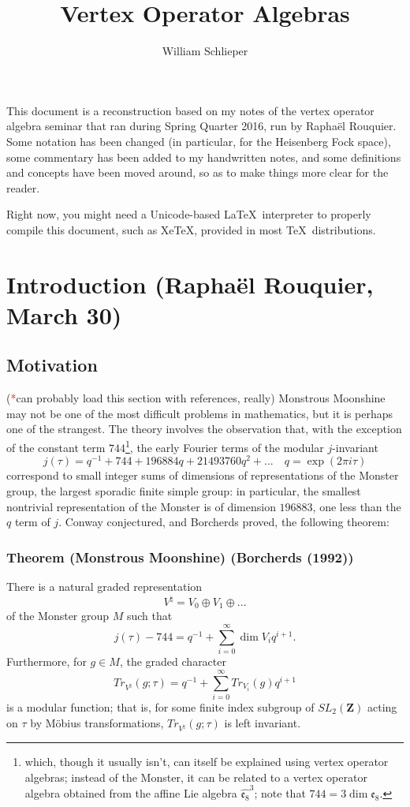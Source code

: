 \documentclass{article}
\author{William Schlieper}
\title{Vertex Operator Algebras}
\newcommand{\ZZ}{\mathbold{Z}}
\newcommand{\tk}{\textcolor{red}{*}}
\begin{document}
\maketitle
This document is a reconstruction based on my notes of the vertex operator algebra seminar that ran during Spring Quarter 2016, run by Raphaël Rouquier.  Some notation has been changed (in particular, for the Heisenberg Fock space), some commentary has been added to my handwritten notes, and some definitions and concepts have been moved around, so as to make things more clear for the reader.

Right now, you might need a Unicode-based \LaTeX\ interpreter to properly compile this document, such as XeTeX, provided in most \TeX\ distributions.
\tableofcontents

\section{Introduction (Raphaël Rouquier, March 30)}
\label{sec:intro}

\subsection{Motivation}
\label{sec:mot}
(\tk can probably load this section with references, really)
Monstrous Moonshine may not be one of the most difficult problems in mathematics, but it is perhaps one of the strangest.  The theory involves the observation that, with the exception of the constant term $744$\footnote{which, though it usually isn't, can itself be explained using vertex operator algebras; instead of the Monster, it can be related to a vertex operator algebra obtained from the affine Lie algebra $\widehat{\mathfrak{e}_8}^3$; note that $744=3 \dim \mathfrak{e}_8$.}, the early Fourier terms of the modular $j$-invariant
\[j(\tau)=q^{-1}+744+196884q+21493760q^2+... \quad q=\exp(2 \pi i \tau)\]
correspond to small integer sums of dimensions of representations of the Monster group, the largest sporadic finite simple group: in particular, the smallest nontrivial representation of the Monster is of dimension $196883$, one less than the $q$ term of $j$.  Conway conjectured, and Borcherds proved, the following theorem:
\subsubsection{Theorem (Monstrous Moonshine) (Borcherds (1992))}
\label{sec:monmoon}
There is a natural graded representation
\[V^\natural = V_0 \oplus V_1 \oplus ... \]
of the Monster group $M$ such that
\[j(\tau)-744=q^{-1}+\sum_{i=0}^{\infty} \dim V_i q^{i+1}. \]
Furthermore, for $g \in M$, the graded character
\[Tr_{V^\natural}(g;\tau)=q^{-1}+\sum_{i=0}^{\infty} Tr_{V_i}(g) q^{i+1} \]
is a modular function; that is, for some finite index subgroup of $SL_2(\ZZ)$ acting on $\tau$ by Möbius transformations, $Tr_{V^\natural}(g;\tau)$ is left invariant.
\end{document}
